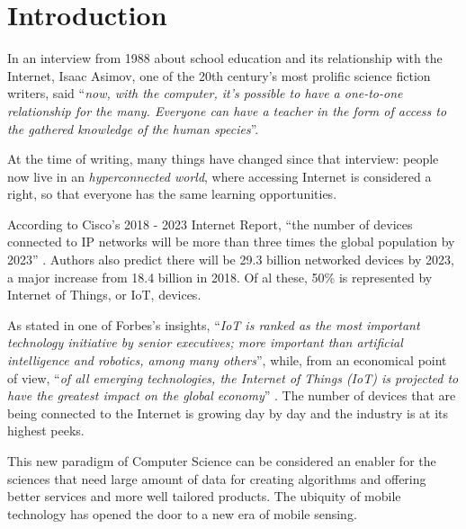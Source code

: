 

\chapter{Introduction}\label{chapter:introduction}

	
	In an interview from 1988 about school education and its relationship with the Internet, Isaac Asimov, one of the 20th century's most prolific science fiction writers, said ``\textit{now, with the computer, it's possible to have a one-to-one relationship for the many. Everyone can have a teacher in the form of access to the gathered knowledge of the human species}''.
	
	At the time of writing, many things have changed since that interview: people now live in an \textit{hyperconnected world}, where accessing Internet is considered a right, so that everyone has the same learning opportunities.
	
	According to Cisco's 2018 - 2023 Internet Report, ``the number of devices connected to IP networks will be more than three times the global population by 2023'' \cite{cisco1}.
	Authors also predict there will be 29.3 billion networked devices by 2023, a major increase from 18.4 billion in 2018. 
	Of al these, 50\% is represented by Internet of Things, or IoT, devices.
	
	As stated in one of Forbes's insights, ``\textit{IoT is ranked as the most important technology initiative by senior executives; more important than artificial intelligence and robotics, among many others}'', while, from an economical point of view, ``\textit{of all emerging technologies, the Internet of Things (IoT) is projected to have the greatest impact on the global economy}'' \cite{forbes}.
	The number of devices that are being connected to the Internet is growing day by day and the industry is at its highest peeks.
	
	This new paradigm of Computer Science can be considered an enabler for the sciences that need large amount of data for creating algorithms and offering better services and more well tailored products.
	The ubiquity of mobile technology has opened the door to a new era of mobile sensing. 
	
